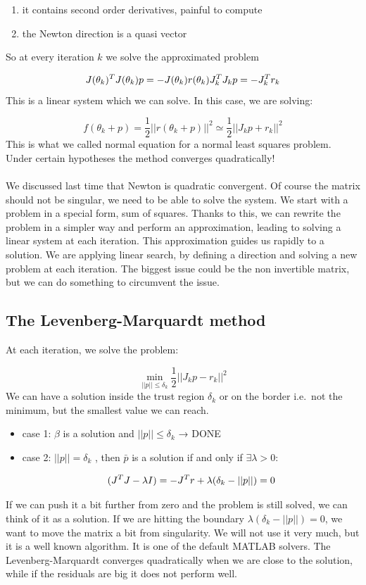 \begin{enumerate}
\def\labelenumi{\arabic{enumi}.}
\tightlist
\item
  it contains second order derivatives, painful to compute
\item
  the Newton direction is a quasi vector
\end{enumerate}

So at every iteration $k$ we solve the approximated problem

$$
J(\theta_k)^TJ(\theta_k)p=-J(\theta_k)r(\theta_k) \\ J_k^TJ_kp=-J_k^T r_k
$$
\noindent
This is a linear system which we can solve. In this case, we are
solving:

$$
f(\theta_k+p)= \frac{1}{2} ||r(\theta_k+p)||^2 \simeq \frac{1}{2} ||J_kp+r_k||^2
$$
\noindent
This is what we called normal equation for a normal least squares
problem. Under certain hypotheses the method converges quadratically!
\\
\\
\noindent
We discussed last time that Newton is quadratic convergent. Of course
the matrix should not be singular, we need to be able to solve the
system. We start with a problem in a special form, sum of squares.
Thanks to this, we can rewrite the problem in a simpler way and perform
an approximation, leading to solving a linear system at each iteration.
This approximation guides us rapidly to a solution. We are applying
linear search, by defining a direction and solving a new problem at each
iteration. The biggest issue could be the non invertible matrix, but we
can do something to circumvent the issue.


\subsection{The Levenberg-Marquardt method}

At each iteration, we solve the problem:

$$
\min_{||p||\leq\delta_k} \frac{1}{2} ||J_kp-r_k||^2
$$
\noindent
We can have a solution inside the trust region $\delta_k$ or on the
border i.e.~not the minimum, but the smallest value we can reach.

\begin{itemize}
\item
  case 1: $\beta$ is a solution and $||p||\leq\delta_k$ → DONE
\item
  case 2: $||p||=\delta_k$ , then $\bar{p}$ is a solution if and only if
  $\exists \lambda > 0$:

  $$
    (J^TJ-\lambda I)=-J^Tr \\ + \lambda(\delta_k-||p||)=0
    $$
\end{itemize}
\noindent
If we can push it a bit further from zero and the problem is still
solved, we can think of it as a solution. If we are hitting the boundary
$\lambda(\delta_k-||p||)=0$, we want to move the matrix a bit from
singularity. We will not use it very much, but it is a well known
algorithm. It is one of the default MATLAB solvers. The
Levenberg-Marquardt converges quadratically when we are close to the
solution, while if the residuals are big it does not perform well.


